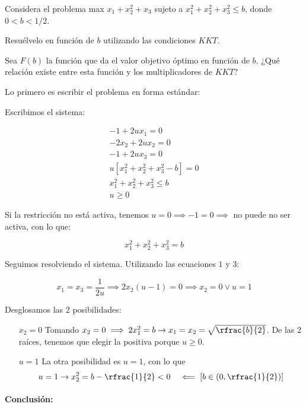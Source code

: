 \begin{problem}[1]

Considera el problema max $x_1+x_2^2+x_3$ sujeto a $x_1^2+x_2^2+x_3^2\leq b$, donde $0<b<1/2$.

\ppart Resuélvelo en función de $b$ utilizando las condiciones $KKT$.

\ppart Sea $F(b)$ la función que da el valor objetivo óptimo en función de $b$. ¿Qué relación existe entre esta función y los multiplicadores de $KKT$?


\solution

Lo primero es escribir el problema en forma estándar:
\begin{ioprob}
\end{ioprob}

\spart Escribimos el sistema:

\[
	\begin{array}{r}
		-1+2ux_1 = 0\\
		-2x_2+2ux_2 = 0\\
		-1+2ux_3 = 0\\
		u[x_1^2+x_2^2+x_3^2-b] = 0\\
		x_1^2+x_2^2+x_3^2≤b\\
		u≥0
	\end{array}
\]

Si la restricción no está activa, tenemos $u=0 \implies -1 = 0 \implies $ no puede no ser activa, con lo que:

\[x_1^2+x_2^2+x_3^2 = b\]


Seguimos resolviendo el sistema.
%
Utilizando las ecuaciones $1$ y $3$:

\[
	x_1 = x_3 = \frac{1}{2u} \implies 2x_2(u-1) = 0 \implies x_2 = 0 \vee u = 1
\]

Desglosamos las 2 posibilidades:

\begin{itemize}
	\item[$x_2=0$] Tomando $x_2 = 0 \implies 2x_1^2 = b \to x_1=x_2=\sqrt{\rfrac{b}{2}}$.
%
De las 2 raíces, tenemos que elegir la positiva porque $u≥0$.

	\item[$u=1$] La otra posibilidad es $u=1$, con lo que 
	\[
		u=1\to x^2_2=b-\rfrac{1}{2} < 0 \;\;\; \impliedby \left[b\in\left(0,\rfrac{1}{2}\right)\right]
	\]
\end{itemize}

\paragraph{Conclusión:} 


\end{problem}
